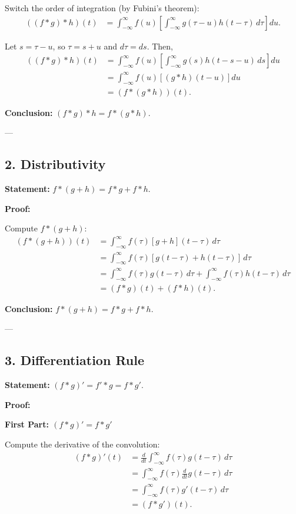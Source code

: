 \documentclass[a4paper,12pt]{article}
\begin{document}
Switch the order of integration (by Fubini's theorem):
\[
\begin{aligned}
((f \ast g) \ast h)(t) &= \int_{-\infty}^{\infty} f(u) \left[ \int_{-\infty}^{\infty} g(\tau - u) h(t - \tau) \, d\tau \right] du.
\end{aligned}
\]

Let \( s = \tau - u \), so \( \tau = s + u \) and \( d\tau = ds \). Then,
\[
\begin{aligned}
((f \ast g) \ast h)(t) &= \int_{-\infty}^{\infty} f(u) \left[ \int_{-\infty}^{\infty} g(s) h(t - s - u) \, ds \right] du \\
&= \int_{-\infty}^{\infty} f(u) \left[ (g \ast h)(t - u) \right] du \\
&= (f \ast (g \ast h))(t).
\end{aligned}
\]

\textbf{Conclusion:} \( (f \ast g) \ast h = f \ast (g \ast h) \).

---

\subsection*{2. Distributivity}
\textbf{Statement:} \( f \ast (g + h) = f \ast g + f \ast h \).

\textbf{Proof:}

Compute \( f \ast (g + h) \):
\[
\begin{aligned}
(f \ast (g + h))(t) &= \int_{-\infty}^{\infty} f(\tau) [g + h](t - \tau) \, d\tau \\
&= \int_{-\infty}^{\infty} f(\tau) [g(t - \tau) + h(t - \tau)] \, d\tau \\
&= \int_{-\infty}^{\infty} f(\tau) g(t - \tau) \, d\tau + \int_{-\infty}^{\infty} f(\tau) h(t - \tau) \, d\tau \\
&= (f \ast g)(t) + (f \ast h)(t).
\end{aligned}
\]

\textbf{Conclusion:} \( f \ast (g + h) = f \ast g + f \ast h \).

---

\subsection*{3. Differentiation Rule}
\textbf{Statement:} \( (f \ast g)' = f' \ast g = f \ast g' \).

\textbf{Proof:}

\textbf{First Part: \( (f \ast g)' = f \ast g' \)}

Compute the derivative of the convolution:
\[
\begin{aligned}
(f \ast g)'(t) &= \frac{d}{dt} \int_{-\infty}^{\infty} f(\tau) g(t - \tau) \, d\tau \\
&= \int_{-\infty}^{\infty} f(\tau) \frac{d}{dt} g(t - \tau) \, d\tau \\
&= \int_{-\infty}^{\infty} f(\tau) g'(t - \tau) \, d\tau \\
&= (f \ast g')(t).
\end{aligned}
\]
\end{document}
